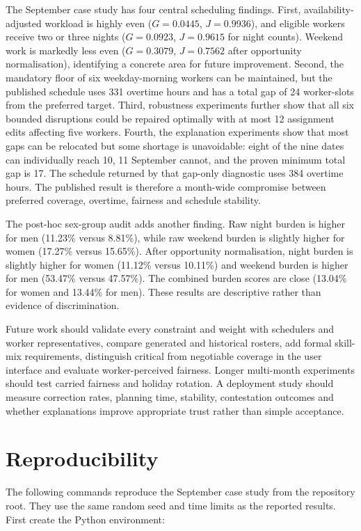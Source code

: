 \documentclass[11pt,a4paper]{article}
\begin{document}
The September case study has four central scheduling findings. First, availability-adjusted workload is highly even ($G=0.0445$, $J=0.9936$), and eligible workers receive two or three nights ($G=0.0923$, $J=0.9615$ for night counts). Weekend work is markedly less even ($G=0.3079$, $J=0.7562$ after opportunity normalisation), identifying a concrete area for future improvement. Second, the mandatory floor of six weekday-morning workers can be maintained, but the published schedule uses 331 overtime hours and has a total gap of 24 worker-slots from the preferred target. Third, robustness experiments further show that all six bounded disruptions could be repaired optimally with at most 12 assignment edits affecting five workers. Fourth, the explanation experiments show that most gaps can be relocated but some shortage is unavoidable: eight of the nine dates can individually reach 10, 11 September cannot, and the proven minimum total gap is 17. The schedule returned by that gap-only diagnostic uses 384 overtime hours. The published result is therefore a month-wide compromise between preferred coverage, overtime, fairness and schedule stability.

The post-hoc sex-group audit adds another finding. Raw night burden is higher for men (11.23\% versus 8.81\%), while raw weekend burden is slightly higher for women (17.27\% versus 15.65\%). After opportunity normalisation, night burden is slightly higher for women (11.12\% versus 10.11\%) and weekend burden is higher for men (53.47\% versus 47.57\%). The combined burden scores are close (13.04\% for women and 13.44\% for men). These results are descriptive rather than evidence of discrimination.

Future work should validate every constraint and weight with schedulers and worker representatives, compare generated and historical rosters, add formal skill-mix requirements, distinguish critical from negotiable coverage in the user interface and evaluate worker-perceived fairness. Longer multi-month experiments should test carried fairness and holiday rotation. A deployment study should measure correction rates, planning time, stability, contestation outcomes and whether explanations improve appropriate trust rather than simple acceptance.

\section{Reproducibility}

The following commands reproduce the September case study from the repository root. They use the same random seed and time limits as the reported results. First create the Python environment:
\end{document}
